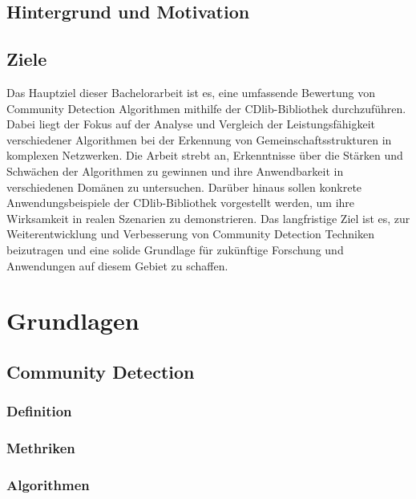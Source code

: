 \section{Hintergrund und Motivation}\label{Hintergrund und Motivation}

\section{Ziele}\label{Ziele}
Das Hauptziel dieser Bachelorarbeit ist es, eine umfassende Bewertung von Community Detection Algorithmen mithilfe der CDlib-Bibliothek durchzuführen. Dabei liegt der Fokus auf der Analyse und Vergleich der Leistungsfähigkeit verschiedener Algorithmen bei der Erkennung von Gemeinschaftsstrukturen in komplexen Netzwerken. Die Arbeit strebt an, Erkenntnisse über die Stärken und Schwächen der Algorithmen zu gewinnen und ihre Anwendbarkeit in verschiedenen Domänen zu untersuchen. Darüber hinaus sollen konkrete Anwendungsbeispiele der CDlib-Bibliothek vorgestellt werden, um ihre Wirksamkeit in realen Szenarien zu demonstrieren. Das langfristige Ziel ist es, zur Weiterentwicklung und Verbesserung von Community Detection Techniken beizutragen und eine solide Grundlage für zukünftige Forschung und Anwendungen auf diesem Gebiet zu schaffen.

\chapter{Grundlagen}

\section{Community Detection}\label{Community Detection}

\subsection{Definition}\label{Definition}

\subsection{Methriken}\label{Methriken}

\subsection{Algorithmen}\label{Algorithmen}

